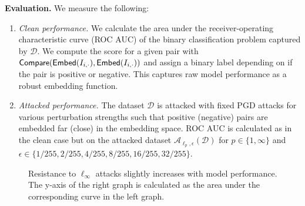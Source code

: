 \documentclass[12pt]{article}
\begin{document}
\textbf{Evaluation.} We measure the following:
\begin{enumerate}
    \item \textit{Clean performance.} 
    We calculate the area under the receiver-operating characteristic curve (ROC AUC) of the binary classification problem captured by $\mathcal{D}$.
    We compute the score for a given pair with $\mathsf{Compare}(\mathsf{Embed}(I_{i,\cdot}), \mathsf{Embed}(I_{i,\cdot}))$ and assign a binary label depending on if the pair is positive or negative.
    This captures raw model performance as a robust embedding function.
    
    \item \textit{Attacked performance.} 
    The dataset $\mathcal{D}$ is attacked with fixed PGD attacks for various perturbation strengths such that positive (negative) pairs are embedded far (close) in the embedding space.
    ROC AUC is calculated as in the clean case but on the attacked dataset $\mathcal{A}_{\ell_p, \epsilon}(\mathcal{D})$ for $p \in \{1, \infty\}$ and $\epsilon \in \{1/255, 2/255, 4/255, 8/255, 16/255, 32/255\}$.
\end{enumerate}

\begin{figure*}[t]
\centering
{}
{}
\caption{Resistance to $\ell_\infty$ attacks slightly increases with model performance. The y-axis of the right graph is calculated as the area under the corresponding curve in the left graph.}
\label{fig:attack_resistance_linf}
\end{figure*}
\end{document}
